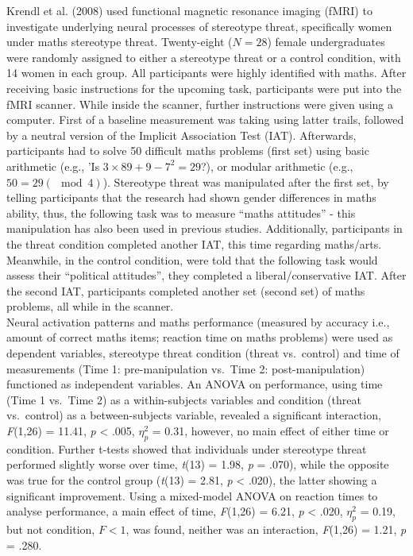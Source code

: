 \documentclass[
  stu,floatsintext]{apa7}
\begin{document}
Krendl et al. (2008) used functional magnetic resonance imaging (fMRI) to investigate underlying neural processes of stereotype threat, specifically women under maths stereotype threat.
Twenty-eight (\(N = 28\)) female undergraduates were randomly assigned to either a stereotype threat or a control condition, with 14 women in each group.
All participants were highly identified with maths.
After receiving basic instructions for the upcoming task, participants were put into the fMRI scanner.
While inside the scanner, further instructions were given using a computer.
First of a baseline measurement was taking using latter trails, followed by a neutral version of the Implicit Association Test (IAT).
Afterwards, participants had to solve 50 difficult maths problems (first set) using basic arithmetic (e.g., 'Is \(3 \times 89+9-7^2 = 29\)?), or modular arithmetic (e.g., \(50 = 29(\mod{4})\)).
Stereotype threat was manipulated after the first set, by telling participants that the research had shown gender differences in maths ability, thus, the following task was to measure ``maths attitudes'' - this manipulation has also been used in previous studies.
Additionally, participants in the threat condition completed another IAT, this time regarding maths/arts.
Meanwhile, in the control condition, were told that the following task would assess their ``political attitudes'', they completed a liberal/conservative IAT.
After the second IAT, participants completed another set (second set) of maths problems, all while in the scanner.\\
Neural activation patterns and maths performance (measured by accuracy i.e., amount of correct maths items; reaction time on maths problems) were used as dependent variables, stereotype threat condition (threat vs.~control) and time of measurements (Time 1: pre-manipulation vs.~Time 2: post-manipulation) functioned as independent variables.
An ANOVA on performance, using time (Time 1 vs.~Time 2) as a within-subjects variables and condition (threat vs.~control) as a between-subjects variable, revealed a significant interaction, \emph{F}(1,26) = 11.41, \emph{p} \textless{} .005, \(\eta^{2}_{p}\) = 0.31, however, no main effect of either time or condition.
Further t-tests showed that individuals under stereotype threat performed slightly worse over time, \emph{t}(13) = 1.98, \emph{p} = .070), while the opposite was true for the control group (\emph{t}(13) = 2.81, \emph{p} \textless{} .020), the latter showing a significant improvement.
Using a mixed-model ANOVA on reaction times to analyse performance, a main effect of time, \emph{F}(1,26) = 6.21, \emph{p} \textless{} .020, \(\eta^{2}_{p}\) = 0.19, but not condition, \(F < 1\), was found, neither was an interaction, \emph{F}(1,26) = 1.21, \emph{p} = .280.
\end{document}
